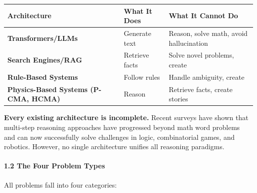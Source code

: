 \documentclass[
  11pt,
  a4paper,
]{article}
\begin{document}
\begin{longtable}[]{@{}
  >{\raggedright\arraybackslash}p{}
  >{\raggedright\arraybackslash}p{}
  >{\raggedright\arraybackslash}p{}@{}}
\toprule\noalign{}
\begin{minipage}[b]{\linewidth}\raggedright
Architecture
\end{minipage} & \begin{minipage}[b]{\linewidth}\raggedright
What It Does
\end{minipage} & \begin{minipage}[b]{\linewidth}\raggedright
What It Cannot Do
\end{minipage} \\
\midrule\noalign{}
\endhead
\bottomrule\noalign{}
\endlastfoot
\textbf{Transformers/LLMs} & Generate text & Reason, solve math, avoid
hallucination \\
\textbf{Search Engines/RAG} & Retrieve facts & Solve novel problems,
create \\
\textbf{Rule-Based Systems} & Follow rules & Handle ambiguity, create \\
\textbf{Physics-Based Systems (P-CMA, HCMA)} & Reason & Retrieve facts,
create stories \\
\end{longtable}

\textbf{Every existing architecture is incomplete.} Recent surveys have
shown that multi-step reasoning approaches have progressed beyond math
word problems and can now successfully solve challenges in logic,
combinatorial games, and robotics. However, no single architecture
unifies all reasoning paradigms.

\paragraph{1.2 The Four Problem Types}\label{the-four-problem-types}

All problems fall into four categories:
\end{document}
